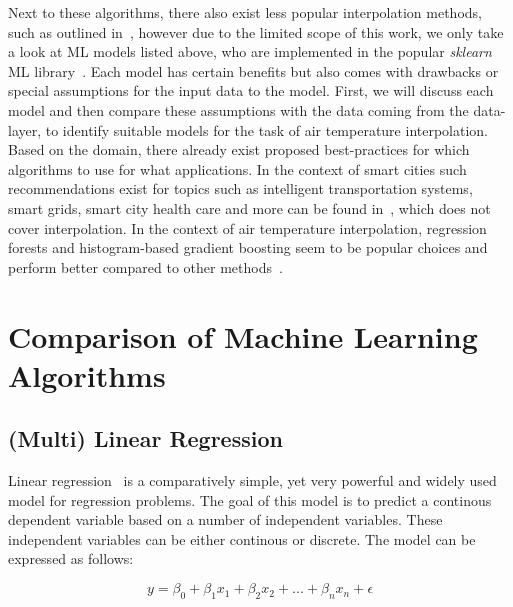Next to these algorithms, there also exist less popular interpolation methods, such as outlined in~\cite{li2014spatial}, however due to the limited scope of this work, we only take a look at ML models listed above, who are implemented in the popular \textit{sklearn} ML library~\cite{scikit-learn}.
Each model has certain benefits but also comes with drawbacks or special assumptions for the input data to the model. First, we will discuss each model and then compare these assumptions with the data coming from the data-layer, to identify suitable models for the task of air temperature interpolation.
Based on the domain, there already exist proposed best-practices for which algorithms to use for what applications. In the context of smart cities such recommendations exist for topics such as intelligent transportation systems, smart grids, smart city health care and more can be found in~\cite{ullah2020applications}, which does not cover interpolation. In the context of air temperature interpolation, regression forests and histogram-based gradient boosting seem to be popular choices and perform better compared to other methods~\cite{apaydin2022evaluation, ho2014mapping}.

\section{Comparison of Machine Learning Algorithms}
\label{sec:comparison ml algorithms}

\subsection{(Multi) Linear Regression}
\label{subsec: linear regression}

Linear regression~\cite{montgomery2021introduction} is a comparatively simple, yet very powerful and widely used model for regression problems. The goal of this model is to predict a continous dependent variable based on a number of independent variables. These independent variables can be either continous or discrete. The model can be expressed as follows:

\begin{equation}
    y = \beta_0 + \beta_1 x_1 + \beta_2 x_2 + ... + \beta_n x_n + \epsilon
\end{equation}

